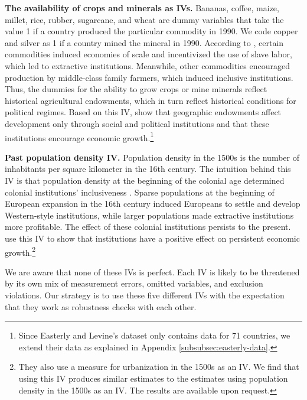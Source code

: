 \textbf{The availability of crops and minerals as IVs.} Bananas, coffee, maize, millet, rice, rubber, sugarcane, and wheat are dummy variables that take the value 1 if a country produced the particular commodity in 1990. We code copper and silver as 1 if a country mined the mineral in 1990. According to \citet{sokoloffInstitutionsFactorEndowments2000}, certain commodities induced economies of scale and incentivized the use of slave labor, which led to extractive institutions. Meanwhile, other commodities encouraged production by middle-class family farmers, which induced inclusive institutions. Thus, the dummies for the ability to grow crops or mine minerals reflect historical agricultural endowments, which in turn reflect historical conditions for political regimes. Based on this IV, \citet{easterlyTropicsGermsCrops2003} show that geographic endowments affect development only through social and political institutions and that these institutions encourage economic growth.\footnote{Since Easterly and Levine's dataset only contains data for 71 countries, we extend their data as explained in Appendix \ref{subsubsec:easterly-data}.} 

\textbf{Past population density IV.} Population density in the 1500s is the number of inhabitants per square kilometer in the 16th century. The intuition behind this IV is that population density at the beginning of the colonial age determined colonial institutions' inclusiveness \citep{acemogluReversalFortuneGeography2002}. Sparse populations at the beginning of European expansion in the 16th century induced Europeans to settle and develop Western-style institutions, while larger populations made extractive institutions more profitable. The effect of these colonial institutions persists to the present. \citet{acemogluReversalFortuneGeography2002} use this IV to show that institutions have a positive effect on persistent economic growth.\footnote{They also use a measure for urbanization in the 1500s as an IV. We find that using this IV produces similar estimates to the estimates using population density in the 1500s as an IV. The results are available upon request.}

We are aware that none of these IVs is perfect. Each IV is likely to be threatened by its own mix of measurement errors, omitted variables, and exclusion violations. Our strategy is to use these five different IVs with the expectation that they work as robustness checks with each other.


